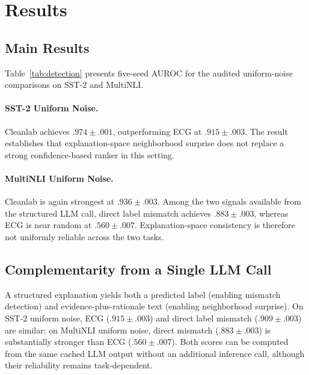 \documentclass[letterpaper]{article}
\begin{document}
\section{Results}
\label{sec:results}

\subsection{Main Results}

Table~\ref{tab:detection} presents five-seed AUROC for the audited uniform-noise comparisons on SST-2 and MultiNLI.

\begingroup
\let\originalunderscore\_
\def\_{\originalunderscore\allowbreak}

\endgroup

\paragraph{SST-2 Uniform Noise.}
Cleanlab achieves $.974 \pm .001$, outperforming ECG at $.915 \pm .003$.
The result establishes that explanation-space neighborhood surprise does not replace a strong confidence-based ranker in this setting.

\paragraph{MultiNLI Uniform Noise.}
Cleanlab is again strongest at $.936 \pm .003$.
Among the two signals available from the structured LLM call, direct label mismatch achieves $.883 \pm .003$, whereas ECG is near random at $.560 \pm .007$.
Explanation-space consistency is therefore not uniformly reliable across the two tasks.

\subsection{Complementarity from a Single LLM Call}

A structured explanation yields both a predicted label (enabling mismatch detection) and evidence-plus-rationale text (enabling neighborhood surprise).
On SST-2 uniform noise, ECG ($.915 \pm .003$) and direct label mismatch ($.909 \pm .003$) are similar; on MultiNLI uniform noise, direct mismatch ($.883 \pm .003$) is substantially stronger than ECG ($.560 \pm .007$).
Both scores can be computed from the same cached LLM output without an additional inference call, although their reliability remains task-dependent.
\end{document}
